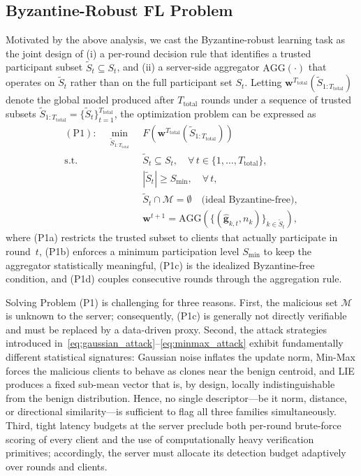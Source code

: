 \documentclass[journal]{IEEEtran}
\begin{document}
\subsection{Byzantine-Robust FL Problem}
\label{sec:p1}

Motivated by the above analysis, we cast the Byzantine-robust learning task as the joint design of (i) a per-round decision rule that identifies a trusted participant subset $\widetilde{S}_t \subseteq S_t$, and (ii) a server-side aggregator $\text{AGG}(\cdot)$ that operates on $\widetilde{S}_t$ rather than on the full participant set $S_t$. Letting $\mathbf{w}^{T_{\text{total}}}(\widetilde{S}_{1:T_{\text{total}}})$ denote the global model produced after $T_{\text{total}}$ rounds under a sequence of trusted subsets $\widetilde{S}_{1:T_{\text{total}}}=\{\widetilde{S}_t\}_{t=1}^{T_{\text{total}}}$, the optimization problem can be expressed as
\begin{subequations}\label{eq:p1}
\begin{align}
(\mathrm{P1}):\quad\min_{\widetilde{S}_{1:T_{\text{total}}}}\;& F\!\left(\mathbf{w}^{T_{\text{total}}}(\widetilde{S}_{1:T_{\text{total}}})\right) \label{eq:p1_obj}\\
\text{s.t.}\quad &\widetilde{S}_t \subseteq S_t,\quad \forall\,t\in\{1,\dots,T_{\text{total}}\}, \tag{P1a}\\
&|\widetilde{S}_t| \ge S_{\min},\quad \forall\,t, \tag{P1b}\\
&\widetilde{S}_t \cap \mathcal{M} = \emptyset \quad \text{(ideal Byzantine-free)}, \tag{P1c}\\
&\mathbf{w}^{t+1}=\text{AGG}\!\left(\{(\hat{\mathbf{g}}_{k,t},n_k)\}_{k\in\widetilde{S}_t}\right),\tag{P1d}
\end{align}
\end{subequations}
where (P1a) restricts the trusted subset to clients that actually participate in round~$t$, (P1b) enforces a minimum participation level $S_{\min}$ to keep the aggregator statistically meaningful, (P1c) is the idealized Byzantine-free condition, and (P1d) couples consecutive rounds through the aggregation rule.

Solving Problem (P1) is challenging for three reasons. First, the malicious set $\mathcal{M}$ is unknown to the server; consequently, (P1c) is generally not directly verifiable and must be replaced by a data-driven proxy. Second, the attack strategies introduced in~\eqref{eq:gaussian_attack}--\eqref{eq:minmax_attack} exhibit fundamentally different statistical signatures: Gaussian noise inflates the update norm, Min-Max forces the malicious clients to behave as clones near the benign centroid, and LIE produces a fixed sub-mean vector that is, by design, locally indistinguishable from the benign distribution. Hence, no single descriptor—be it norm, distance, or directional similarity—is sufficient to flag all three families simultaneously. Third, tight latency budgets at the server preclude both per-round brute-force scoring of every client and the use of computationally heavy verification primitives; accordingly, the server must allocate its detection budget adaptively over rounds and clients.
\end{document}
